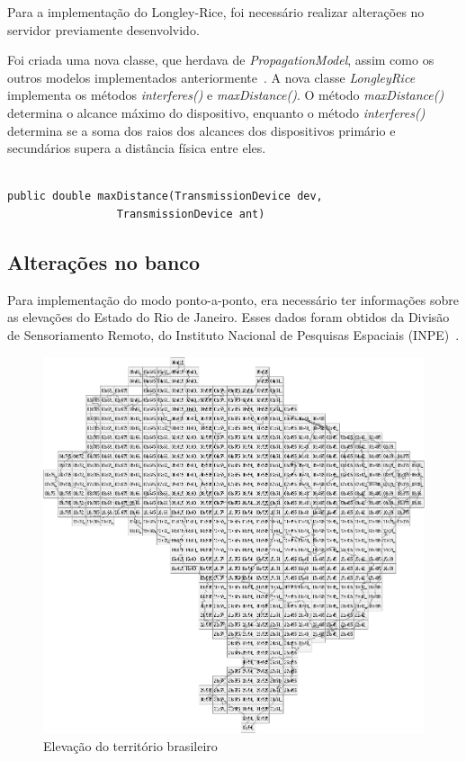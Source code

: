 Para a implementação do Longley-Rice, foi necessário realizar alterações no servidor previamente desenvolvido. 

Foi criada uma nova classe, que herdava de \textit{PropagationModel}, assim como os outros modelos implementados anteriormente~\cite{tccmarcelo}. A nova classe \textit{LongleyRice} implementa os métodos \textit{
interferes()} e \textit{maxDistance()}. O método \textit{maxDistance()} determina o alcance máximo do dispositivo, enquanto o método \textit{interferes()} determina se a soma dos raios dos alcances dos dispositivos primário e secundários supera a distância física entre eles.

\begin{lstlisting}

public double maxDistance(TransmissionDevice dev,
				 TransmissionDevice ant)

\end{lstlisting}

\subsection{Alterações no banco}

Para implementação do modo ponto-a-ponto, era necessário ter informações sobre as elevações do Estado do Rio de Janeiro. Esses dados foram obtidos da Divisão de Sensoriamento Remoto, do Instituto Nacional de Pesquisas Espaciais (INPE)~\cite{elevationdata}.

\begin{figure}[htb]
\centering
\includegraphics[width=1\textwidth]{figs/elevacaobrasil}
\caption[Elevação do território brasileiro.]
{Elevação do território brasileiro}
\label{fig:elevacaobrasil}
\end{figure}

